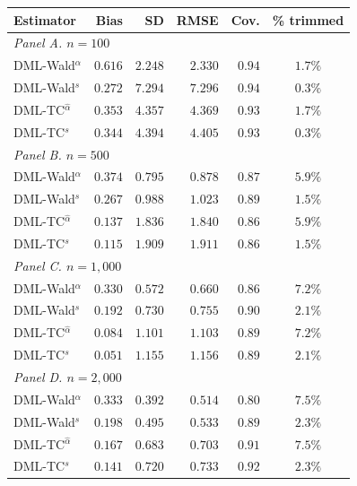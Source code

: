 \begin{tabular}{lrrrrc}
\toprule
Estimator & Bias & SD & RMSE & Cov. & \% trimmed \\
\midrule
\multicolumn{6}{l}{\textit{Panel A. $n = 100$}} \\
\midrule
DML-Wald$^{\hat\alpha}$ & $0.616$ & $2.248$ & $2.330$ & $0.94$ & $1.7\%$ \\
DML-Wald$^{s}$          & $0.272$ & $7.294$ & $7.296$ & $0.94$ & $0.3\%$ \\
DML-TC$^{\hat\alpha}$   & $0.353$ & $4.357$ & $4.369$ & $0.93$ & $1.7\%$ \\
DML-TC$^{s}$            & $0.344$ & $4.394$ & $4.405$ & $0.93$ & $0.3\%$ \\
\midrule
\multicolumn{6}{l}{\textit{Panel B. $n = 500$}} \\
\midrule
DML-Wald$^{\hat\alpha}$ & $0.374$ & $0.795$ & $0.878$ & $0.87$ & $5.9\%$ \\
DML-Wald$^{s}$          & $0.267$ & $0.988$ & $1.023$ & $0.89$ & $1.5\%$ \\
DML-TC$^{\hat\alpha}$   & $0.137$ & $1.836$ & $1.840$ & $0.86$ & $5.9\%$ \\
DML-TC$^{s}$            & $0.115$ & $1.909$ & $1.911$ & $0.86$ & $1.5\%$ \\
\midrule
\multicolumn{6}{l}{\textit{Panel C. $n = 1{,}000$}} \\
\midrule
DML-Wald$^{\hat\alpha}$ & $0.330$ & $0.572$ & $0.660$ & $0.86$ & $7.2\%$ \\
DML-Wald$^{s}$          & $0.192$ & $0.730$ & $0.755$ & $0.90$ & $2.1\%$ \\
DML-TC$^{\hat\alpha}$   & $0.084$ & $1.101$ & $1.103$ & $0.89$ & $7.2\%$ \\
DML-TC$^{s}$            & $0.051$ & $1.155$ & $1.156$ & $0.89$ & $2.1\%$ \\
\midrule
\multicolumn{6}{l}{\textit{Panel D. $n = 2{,}000$}} \\
\midrule
DML-Wald$^{\hat\alpha}$ & $0.333$ & $0.392$ & $0.514$ & $0.80$ & $7.5\%$ \\
DML-Wald$^{s}$          & $0.198$ & $0.495$ & $0.533$ & $0.89$ & $2.3\%$ \\
DML-TC$^{\hat\alpha}$   & $0.167$ & $0.683$ & $0.703$ & $0.91$ & $7.5\%$ \\
DML-TC$^{s}$            & $0.141$ & $0.720$ & $0.733$ & $0.92$ & $2.3\%$ \\
\bottomrule
\end{tabular}
